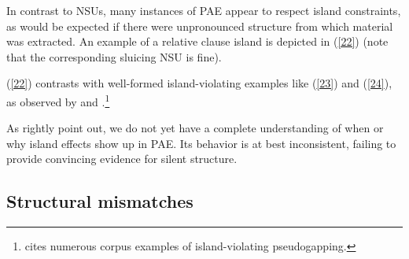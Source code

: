 In contrast to NSUs, many instances of PAE appear to respect island constraints, as would be expected if there were unpronounced structure from which material was extracted. An example of a relative clause island is depicted in (\ref{22}) (note that the corresponding sluicing NSU  is fine).


\z
(\ref{22}) contrasts with well-formed island-violating examples like (\ref{23}) and (\ref{24}), as observed by \citet[]{Miller2014} and \citet[]{Ginzburg2018}.\footnote{\citet{Miller2014} cites numerous corpus examples of island-violating pseudogapping.}
%
%
\eal
{}

\zl
%

As \citet{Ginzburg2018} rightly point out, we do not yet have a complete understanding of when or why island effects show up in PAE. Its behavior is at best inconsistent, failing to provide convincing evidence for silent structure.


\subsection{Structural mismatches}
\label{sec-structural-mismatches}

